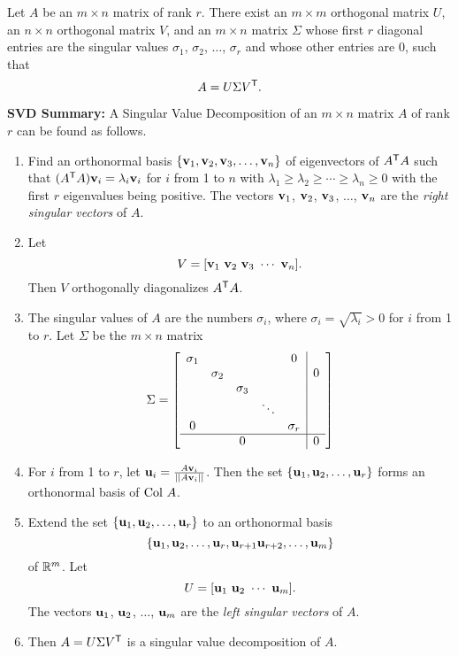 \begin{theorem} Let $A$ be an $m \times n$ matrix of rank $r$. There exist an $m \times m$ orthogonal matrix $U$, an $n \times n$ orthogonal matrix $V$, and an $m \times n$ matrix $\Sigma$ whose first $r$ diagonal entries are the singular values $\sigma_1$, $\sigma_2$, $\ldots$, $\sigma_r$ and whose other entries are 0, such that
\[A = U \Sigma V^{\mathsf{T}}.\]
\end{theorem}



 \noindent \textbf{SVD Summary: } A Singular Value Decomposition of an $m \times n$ matrix $A$ of rank $r$ can be found as follows.
	\begin{enumerate}
	\item Find an orthonormal basis $\{\mathbf{v}_1, \mathbf{v}_2, \mathbf{v}_3, \ldots, \mathbf{v}_n\}$ of eigenvectors of $A^{\mathsf{T}}A$ such that $(A^{\mathsf{T}}A) \mathbf{v}_i = \lambda_i \mathbf{v}_i$ for $i$ from 1 to $n$ with $\lambda_1 \geq \lambda_{2} \geq \cdots \geq \lambda_n \geq 0$ with the first $r$ eigenvalues being positive. The vectors $\mathbf{v}_1$, $\mathbf{v}_2$, $\mathbf{v}_3$, $\ldots$, $\mathbf{v}_n$ are the \emph{right singular vectors} of $A$.
	\item Let
\[V= [\mathbf{v}_1 \  \mathbf{v}_2 \  \mathbf{v}_3 \  \cdots \  \mathbf{v}_n ].\]
Then $V$ orthogonally diagonalizes $A^{\mathsf{T}}A$.
	\item The singular values of $A$ are the numbers $\sigma_i$, where $\sigma_i = \sqrt{\lambda_i} > 0$ for $i$ from 1 to $r$. Let $\Sigma$ be the $m \times n$ matrix 
\[\Sigma = \left[ \begin{array}{ccccc|c} \sigma_1&&&&0& \\ & \sigma_2&&&&0 \\ && \sigma_3&&& \\ &  & & \ddots & & \\ 0&&&& \sigma_r \\ \hline &&0&&&0 \end{array} \right] \]
	\item For $i$ from 1 to $r$, let $\mathbf{u}_i = \frac{A\mathbf{v}_i}{||A\mathbf{v}_i||}$. Then the set $\{\mathbf{u}_1, \mathbf{u}_2, \ldots, \mathbf{u}_r\}$ forms an orthonormal basis of $\text{Col } A$.
	\item Extend the set $\{\mathbf{u}_1, \mathbf{u}_2, \ldots, \mathbf{u}_r\}$ to an orthonormal basis 
\[\{\mathbf{u}_1, \mathbf{u}_2, \ldots, \mathbf{u}_r, \mathbf{u}_{r+1} \mathbf{u}_{r+2}, \ldots, \mathbf{u}_m\}\]
of $\mathbb{R}^m$. Let
\[U = [\mathbf{u}_1 \ \mathbf{u}_2 \ \cdots \ \mathbf{u}_m].\]
The vectors $\mathbf{u}_1$, $\mathbf{u}_2$, $\ldots$, $\mathbf{u}_m$ are the \emph{left singular vectors} of $A$.
	\item Then $A = U \Sigma V^{\mathsf{T}}$ is a singular value decomposition of $A$.
	\end{enumerate}



